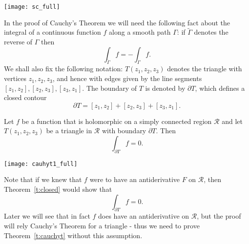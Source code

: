 \begin{center}
\hspace{-2cm}
\texttt{[image: sc\_full]}
\end{center}
In the proof of Cauchy's Theorem we will need the following fact about the integral of a continuous function $f$ along a smooth path $\Gamma$: if $\tilde{\Gamma}$ denotes the reverse of $\Gamma$ then
\[
\int_{\tilde{\Gamma}} f = - \int_{\Gamma} f.
\]
We shall also fix the following notation: $T(z_1,z_2,z_3)$ denotes the triangle with vertices $z_1,z_2,z_3$, and hence with edges given by the line segments $[z_1,z_2],[z_2,z_3],[z_3,z_1]$.  The boundary of $T$ is denoted by $\partial T$, which defines a closed contour
\[
\partial T = [z_1,z_2] + [z_2,z_3] + [z_3,z_1].
\]
\begin{theorem}
\label{t:cauchyt} Let $f$ be a function that is holomorphic on a simply connected region $\mathcal{R}$ and let $T(z_1,z_2,z_3)$ be a triangle in $\mathcal{R}$ with boundary $\partial T$.  Then
\[
\int_{\partial T} f = 0.
\]
\end{theorem}
\begin{center}
\texttt{[image: cauhyt1\_full]}
\end{center}
Note that if we knew that $f$ were to have an antiderivative $F$ on $\mathcal{R}$, then Theorem~\ref{t:closed} would show that
\[
\int_{\partial T} f =0.
\]
Later we will see that in fact $f$ does have an antiderivative on $\mathcal{R}$, but the proof will rely Cauchy's Theorem for a triangle - thus we need to prove Theorem~\ref{t:cauchyt} without this assumption.
